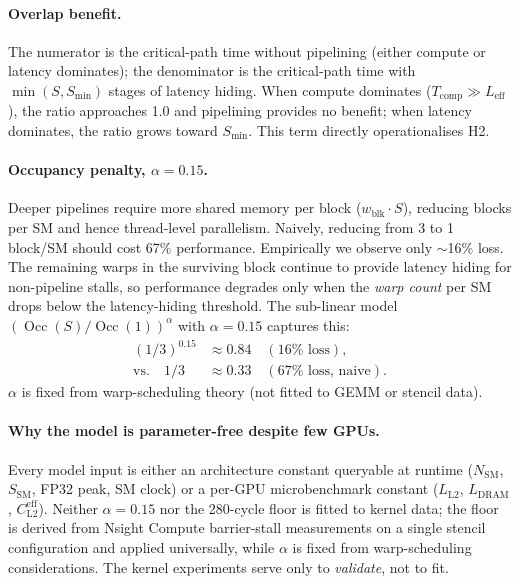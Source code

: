 \documentclass[10pt,twocolumn]{article}
\newcommand{\cleff}{C_{\text{L2}}^{\text{eff}}}
\newcommand{\Leff}{L_{\text{eff}}}
\newcommand{\LLtwo}{L_{\text{L2}}}
\newcommand{\Ldram}{L_{\text{DRAM}}}
\newcommand{\Tcomp}{T_{\text{comp}}}
\newcommand{\Smin}{S_{\min}}
\begin{document}
\paragraph{Overlap benefit.}
The numerator is the critical-path time without pipelining (either
compute or latency dominates); the denominator is the critical-path
time with $\min(S, \Smin)$ stages of latency hiding.  When compute
dominates ($\Tcomp \gg \Leff$), the ratio approaches 1.0 and
pipelining provides no benefit; when latency dominates, the ratio
grows toward $\Smin$.  This term directly operationalises H2.

\paragraph{Occupancy penalty, $\alpha = 0.15$.}
Deeper pipelines require more shared memory per block
($w_{\text{blk}} \cdot S$), reducing blocks per SM and hence
thread-level parallelism.  Naively, reducing from 3 to 1 block/SM
should cost 67\% performance.  Empirically we observe only
$\sim$16\% loss.  The remaining warps in the surviving block
continue to provide latency hiding for non-pipeline stalls, so
performance degrades only when the \emph{warp count} per SM drops
below the latency-hiding threshold.  The sub-linear model
$(\operatorname{Occ}(S)/\operatorname{Occ}(1))^{\alpha}$ with
$\alpha = 0.15$ captures this:
\begin{align*}
  (1/3)^{0.15} &\approx 0.84 \quad (16\%\text{ loss}), \\
  \text{vs.}\quad 1/3 &\approx 0.33 \quad (67\%\text{ loss, naive}).
\end{align*}
$\alpha$ is fixed from warp-scheduling theory (not fitted to GEMM
or stencil data).

\paragraph{Why the model is parameter-free despite few GPUs.}
Every model input is either an architecture constant queryable at
runtime ($N_{\text{SM}}$, $S_{\text{SM}}$, FP32 peak, SM clock) or
a per-GPU microbenchmark constant ($\LLtwo$, $\Ldram$, $\cleff$).
Neither $\alpha = 0.15$ nor the 280-cycle floor is fitted to kernel
data; the floor is derived from Nsight Compute barrier-stall
measurements on a single stencil configuration and applied
universally, while $\alpha$ is fixed from warp-scheduling
considerations.  The kernel experiments serve only to \emph{validate},
not to fit.
\end{document}
